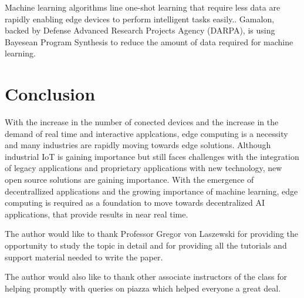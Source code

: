 \documentclass[sigconf]{acmart}
\begin{document}
Machine learning algorithms line one-shot learning that require less data are rapidly enabling edge devices to perform intelligent tasks easily.\cite{wiki-one-shot-learning}.
Gamalon, backed by Defense Advanced Research Projects Agency (DARPA), is using Bayesean Program Synthesis to reduce the amount of data required for machine learning.\cite{ai-to-edge}  

\section{Conclusion}
With the increase in the number of conected devices and the increase in the demand of real time and interactive applcations, edge computing is a necessity and many industries are rapidly moving towards edge solutions. Although industrial IoT is gaining importance but still faces challenges with the integration of legacy applications and proprietary applications with new technology, new open source solutions are gaining importance. With the emergence of decentrallized applications and the growing importance of machine learning, edge computing is required as a foundation to move towards decentralized AI applications, that provide results in near real time.  

\begin{acks}
The author would like to thank Professor Gregor von Laszewski for providing the opportunity to study the topic in detail and for providing all the tutorials and support material needed to write the paper.

The author would also like to thank other associate instructors of the class for helping promptly with queries on piazza which helped everyone a great deal.
\end{acks}


 
\end{document}
